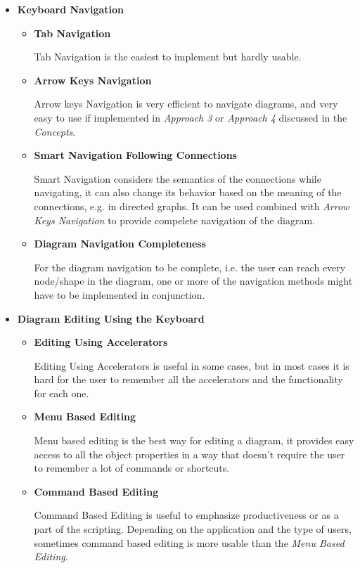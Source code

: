 \begin{itemize}
\item {\bf Keyboard Navigation}

\begin{itemize}
	\item {\bf Tab Navigation}
	\par \noindent
	Tab Navigation is the easiest to implement but hardly usable.

	\item {\bf Arrow Keys Navigation}
	\par \noindent
	Arrow keys Navigation is very efficient to navigate diagrams, and very easy to use if implemented in {\em Approach 3} or {\em Approach 4} discussed in the {\em Concepts}.

	\item {\bf Smart Navigation Following Connections}
	\par \noindent
	Smart Navigation considers the semantics of the connections while navigating, it can also change its behavior based on the meaning of the connections, e.g. in directed graphs. It can be used combined with {\em Arrow Keys Navigation} to provide compelete navigation of the diagram.

	\item {\bf Diagram Navigation Completeness}
	\par \noindent
	For the diagram navigation to be complete, i.e. the user can reach every node/shape in the diagram, one or more of the navigation methods might have to be implemented in conjunction.
\end{itemize}

\item {\bf Diagram Editing Using the Keyboard}
\begin{itemize}
	\item {\bf Editing Using Accelerators} 
	\par \noindent
	Editing Using Accelerators is useful in some cases, but in most cases it is hard for the user to remember all the accelerators and the functionality for each one.
	
	\item {\bf Menu Based Editing}
	\par \noindent
	Menu based editing is the best way for editing a diagram, it provides easy access to all the object properties in a way that doesn't require the user to remember a lot of commands or shortcuts.
	
	\item {\bf Command Based Editing}
	\par \noindent
	Command Based Editing is useful to emphasize productiveness or as a part of the scripting. Depending on the application and the type of users, sometimes command based editing is more usable than the {\em Menu Based Editing}.
	

\end{itemize}
\end{itemize}
